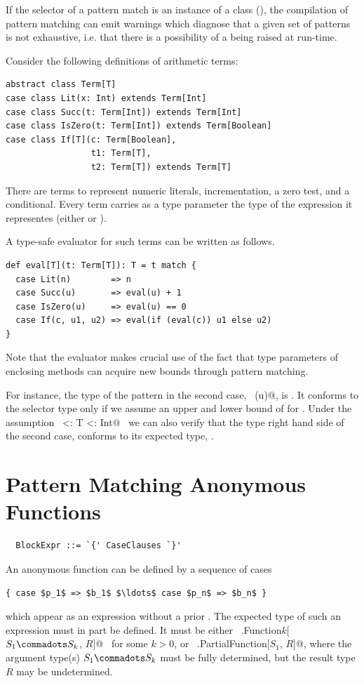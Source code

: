 If the selector of a pattern match is an instance of a
\lstinline@sealed@ class (), 
the compilation of pattern matching can emit warnings which diagnose
that a given set of patterns is not exhaustive, i.e. that there is a
possibility of a  being raised at run-time. 

\example\label{ex:eval}
 Consider the following definitions of arithmetic terms:

\begin{lstlisting}
abstract class Term[T]
case class Lit(x: Int) extends Term[Int]
case class Succ(t: Term[Int]) extends Term[Int]
case class IsZero(t: Term[Int]) extends Term[Boolean]
case class If[T](c: Term[Boolean],
                 t1: Term[T],
                 t2: Term[T]) extends Term[T]
\end{lstlisting}
There are terms to represent numeric literals, incrementation, a zero
test, and a conditional. Every term carries as a type parameter the
type of the expression it representes (either  or ).

A type-safe evaluator for such terms can be written as follows.
\begin{lstlisting}
def eval[T](t: Term[T]): T = t match {
  case Lit(n)        => n
  case Succ(u)       => eval(u) + 1
  case IsZero(u)     => eval(u) == 0
  case If(c, u1, u2) => eval(if (eval(c)) u1 else u2)
}
\end{lstlisting}
Note that the evaluator makes crucial use of the fact that type
parameters of enclosing methods can acquire new bounds through pattern
matching.

For instance, the type of the pattern in the second case,
~\lstinline@Succ(u)@, is . It conforms to the selector type
 only if we assume an upper and lower bound of  for .
Under the assumption ~\lstinline@Int <: T <: Int@~ we can also
verify that the type right hand side of the second case, 
conforms to its expected type, .

\section{Pattern Matching Anonymous Functions}
\label{sec:pattern-closures}

\syntax\begin{lstlisting}
  BlockExpr ::= `{' CaseClauses `}'
\end{lstlisting}

An anonymous function can be defined by a sequence of cases 
\begin{lstlisting}
{ case $p_1$ => $b_1$ $\ldots$ case $p_n$ => $b_n$ }
\end{lstlisting}
which appear as an expression without a prior .  The
expected type of such an expression must in part be defined. It must
be either ~\lstinline@scala.Function$k$[$S_1 \commadots S_k$, $R$]@~ for some $k > 0$,
or ~\lstinline@scala.PartialFunction[$S_1$, $R$]@, where the
argument type(s) $S_1 \commadots S_k$ must be fully determined, but the result type
$R$ may be undetermined.

